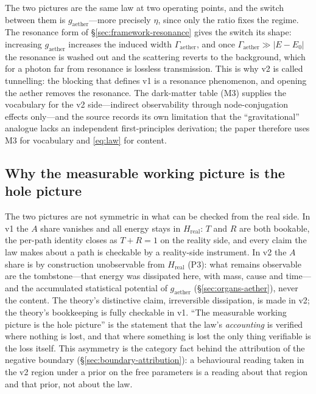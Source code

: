 \documentclass[11pt,a4paper]{article}
\newcommand{\gaether}{g_{\mathrm{aether}}}
\newcommand{\Hreal}{H_{\mathrm{real}}}
\begin{document}
The two pictures are the same law at two operating points, and the switch between them is $\gaether$---more precisely $\eta$, since only the ratio fixes the regime. The resonance form of \S\ref{sec:framework-resonance} gives the switch its shape: increasing $\gaether$ increases the induced width $\Gamma_{\mathrm{aether}}$, and once $\Gamma_{\mathrm{aether}} \gg \lvert E - E_0 \rvert$ the resonance is washed out and the scattering reverts to the background, which for a photon far from resonance is lossless transmission. This is why v2 is called tunnelling: the blocking that defines v1 is a resonance phenomenon, and opening the aether removes the resonance. The dark-matter table (M3) supplies the vocabulary for the v2 side---indirect observability through node-conjugation effects only---and the source records its own limitation that the ``gravitational'' analogue lacks an independent first-principles derivation; the paper therefore uses M3 for vocabulary and \eqref{eq:law} for content.

\subsection{Why the measurable working picture is the hole picture}
\label{sec:duality-measurable}

The two pictures are not symmetric in what can be checked from the real side. In v1 the $A$ share vanishes and all energy stays in $\Hreal$: $T$ and $R$ are both bookable, the per-path identity closes as $T + R = 1$ on the reality side, and every claim the law makes about a path is checkable by a reality-side instrument. In v2 the $A$ share is by construction unobservable from $\Hreal$ (P3): what remains observable are the tombstone---that energy was dissipated here, with mass, cause and time---and the accumulated statistical potential of $\gaether$ (\S\ref{sec:organs-aether}), never the content. The theory's distinctive claim, irreversible dissipation, is made in v2; the theory's bookkeeping is fully checkable in v1. ``The measurable working picture is the hole picture'' is the statement that the law's \emph{accounting} is verified where nothing is lost, and that where something is lost the only thing verifiable is the loss itself. This asymmetry is the category fact behind the attribution of the negative boundary (\S\ref{sec:boundary-attribution}): a behavioural reading taken in the v2 region under a prior on the free parameters is a reading about that region and that prior, not about the law.

\end{document}

